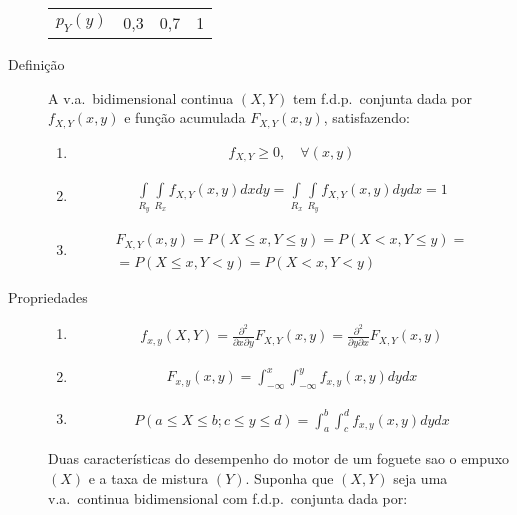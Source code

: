 \begin{description}
\begin{example}
\begin{table}[H]
\begin{tabular}{c c c c}
          $p_Y(y)$  & 0{,}3&0{,}7&1 
        \end{tabular} 
      \end{table}
  \end{example}
\item [Definição] A v.a.\ bidimensional continua $(X,Y)$ tem f.d.p.\ conjunta dada por $f_{X,Y}(x,y)$ e função acumulada $F_{X,Y}(x,y)$, satisfazendo:
  \begin{enumerate}[leftmargin=*, label=\roman*., widest=IV, align=left]
    \item 
     \begin{align}
      f_{X,Y} \geq 0, \quad \forall (x,y)
     \end{align} 
    \item  
     \begin{align*}
      \int \limits_{R_{y}} \int \limits_{R_{x}} f_{X,Y} (x,y) dx dy = \int \limits_{R_{x}} \int \limits_{R_{y}} f_{X,Y} (x,y) dy dx= 1
     \end{align*} 
    \item 
      \begin{align*}
        F_{X,Y}(x,y) = P(X \leq x, Y\leq y)= P(X < x, Y\leq y)= \\
        = P(X \leq x, Y< y)= P(X<x, Y<y)
      \end{align*}
  \end{enumerate}
\item[Propriedades] \hfill
  \begin{enumerate}[label=(\alph*)]
    \item 
      \begin{align*}
        f_{x,y} (X,Y)= \frac{\partial^2}{\partial x \partial y}F_{X,Y} (x,y)= \frac{\partial^2}{\partial y \partial x}F_{X,Y} (x,y)
      \end{align*}
    \item 
      \begin{align*}
        F_{x,y} (x,y)= \int_{- \infty}^{x} \int_{- \infty}^{y} f_{x,y}(x,y) dy dx
      \end{align*}
      \item 
        \begin{align*} 
          P(a \leq X \leq b ; c \leq y \leq d) = \int_{a}^{b} \int_{c}^{d} f_{x,y} (x,y) dy dx
        \end{align*}
  \end{enumerate}
  \begin{example}  Duas características do desempenho do motor de um foguete sao o empuxo $(X)$ e a taxa de mistura $(Y)$. Suponha que $(X,Y)$ seja uma v.a.\ continua bidimensional com f.d.p.\ conjunta dada por:

\end{example}
\end{description}
